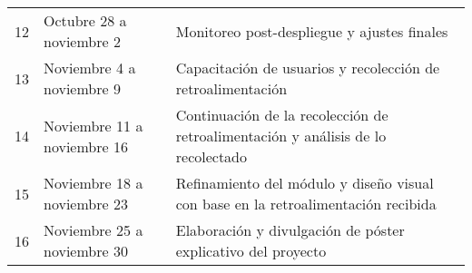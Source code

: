\documentclass{fmb-proposal}
\begin{document}
\begin{table}[ht]
\begin{tabular}{p{1.2cm}p{4.3cm}p{8cm}}
		12              & Octubre 28 a noviembre 2      & Monitoreo post-despliegue y ajustes finales                                          \\
		13              & Noviembre 4 a noviembre 9     & Capacitación de usuarios y recolección de retroalimentación                          \\
		14              & Noviembre 11 a noviembre 16   & Continuación de la recolección de retroalimentación y análisis de lo recolectado     \\
		15              & Noviembre 18 a noviembre 23   & Refinamiento del módulo y diseño visual con base en la retroalimentación recibida    \\
		16              & Noviembre 25 a noviembre 30   & Elaboración y divulgación de póster explicativo del proyecto                         \\
		\bottomrule
	\end{tabular}
\end{table}
\end{document}
